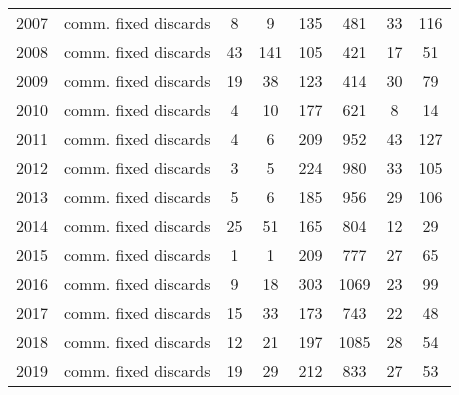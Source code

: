 \begin{longtable}[t]{c>{\centering\arraybackslash}p{3cm}cccccc}
2007 & comm. fixed discards & 8 & 9 & 135 & 481 & 33 & 116\\
2008 & comm. fixed discards & 43 & 141 & 105 & 421 & 17 & 51\\
2009 & comm. fixed discards & 19 & 38 & 123 & 414 & 30 & 79\\
2010 & comm. fixed discards & 4 & 10 & 177 & 621 & 8 & 14\\
2011 & comm. fixed discards & 4 & 6 & 209 & 952 & 43 & 127\\
2012 & comm. fixed discards & 3 & 5 & 224 & 980 & 33 & 105\\
2013 & comm. fixed discards & 5 & 6 & 185 & 956 & 29 & 106\\
2014 & comm. fixed discards & 25 & 51 & 165 & 804 & 12 & 29\\
2015 & comm. fixed discards & 1 & 1 & 209 & 777 & 27 & 65\\
2016 & comm. fixed discards & 9 & 18 & 303 & 1069 & 23 & 99\\
2017 & comm. fixed discards & 15 & 33 & 173 & 743 & 22 & 48\\
2018 & comm. fixed discards & 12 & 21 & 197 & 1085 & 28 & 54\\
2019 & comm. fixed discards & 19 & 29 & 212 & 833 & 27 & 53\\*
\end{longtable}
\endgroup{}
\endgroup{}
